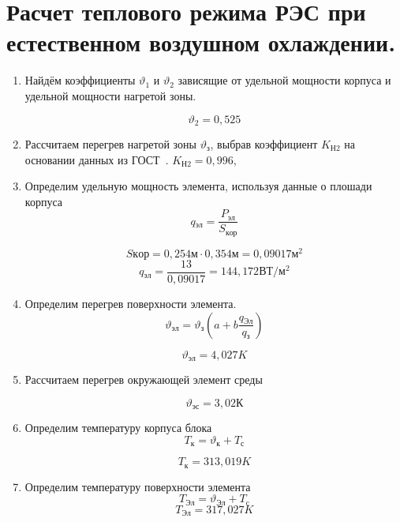 \section{Расчет теплового режима РЭС при естественном воздушном охлаждении.}




\begin{enumerate}[label={\arabic*.}]
\item Найдём коэффициенты
$\vartheta_1$ и $\vartheta_2$ зависящие
от удельной мощности корпуса и удельной мощности нагретой зоны.




$$\vartheta_2 = 0,525$$


\item Рассчитаем перегрев нагретой зоны $\vartheta\mathrm{_з}$,
  выбрав коэффициент $K\mathrm{_{Н2}}$ на основании данных из
  ГОСТ~\cite{GOST_15150-69}.
    $K\mathrm{_{Н2}} = 0,996$, 




  \item Определим удельную мощность элемента, используя данные о плошади
корпуса
    \begin{equation}
      q\mathrm{_{эл}} = \frac{P\mathrm{_{эл}}}{S\mathrm{_{кор}}}
    \end{equation}

    $$S\mathrm{кор} = 0,254\mathrm{м} \cdot 0,354\mathrm{м} = 0,09017\mathrm{м^2}$$
    $$q\mathrm{_{эл}} = \frac{13}{0,09017} =144,172\mathrm{ВТ/м^2} $$

  \item Определим перегрев поверхности элемента.
    \begin{equation}
      \vartheta\mathrm{_{эл}} = \vartheta\mathrm{_{з}}(a + b \frac{q\mathrm{_{Эл}}}{q\mathrm{_{з}}})
    \end{equation}

   $$\vartheta\mathrm{_{эл}} = 4,027K$$

  \item Рассчитаем перегрев окружающей элемент среды

    $$\vartheta\mathrm{_{эс}} = 3,02К$$
  \item Определим температуру корпуса блока
    \begin{equation}
      T\mathrm{_к} = \vartheta\mathrm{_к} + T\mathrm{_с}
    \end{equation}

    $$T\mathrm{_к} = 313,019K$$

  \item Определим температуру поверхности элемента
    \begin{equation}
      T\mathrm{_{Эл}} = \vartheta\mathrm{_{Эл}} + T\mathrm{_c}
    \end{equation}
    $$T\mathrm{_{Эл}} = 317,027 K$$


\end{enumerate}

